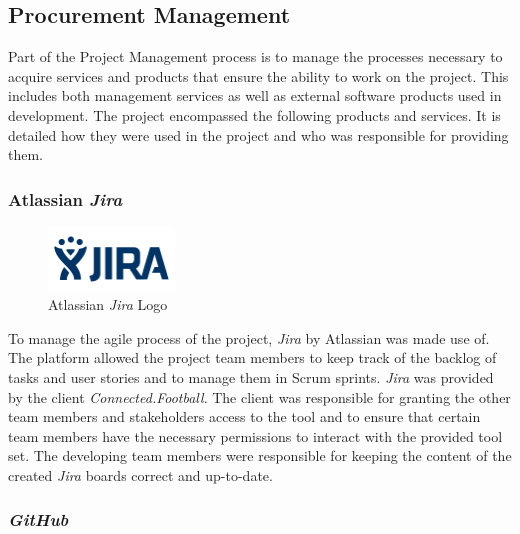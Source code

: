 
\subsection{Procurement Management}
\label{ssec:procurement_management}

Part of the Project Management process is to manage the processes necessary to acquire services and products that ensure the ability to work on the project. This includes both management services as well as external software products used in development.
\newline
The project encompassed the following products and services. It is detailed how they were used in the project and who was responsible for providing them.

\subsubsection{Atlassian \textit{Jira}}
\label{sssec:jira}

\begin{figure}[H]
    \begin{center}
        \includegraphics[width=0.3\textwidth]{images/logos/jira-logo.png}
        \caption{Atlassian \textit{Jira} Logo}
        \label{fig:jira_logo}
    \end{center}
\end{figure}

To manage the agile process of the project, \textit{Jira} by Atlassian was made use of. The platform allowed the project team members to keep track of the backlog of tasks and user stories and to manage them in Scrum sprints.
\newline
\textit{Jira} was provided by the client \textit{Connected.Football}. The client was responsible for granting the other team members and stakeholders access to the tool and to ensure that certain team members have the necessary permissions to interact with the provided tool set. The developing team members were responsible for keeping the content of the created \textit{Jira} boards correct and up-to-date.

\subsubsection{\textit{GitHub}}
\label{sssec:github}

